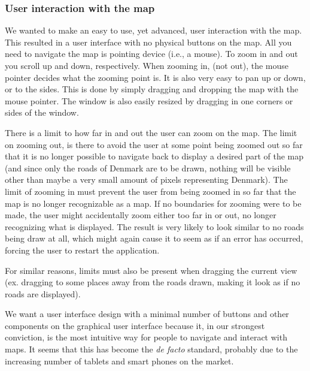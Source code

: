 \subsubsection{User interaction with the map}
We wanted to make an easy to use, yet advanced, user interaction with the map. This resulted in a user interface with no physical buttons on the map. All you need to navigate the map is pointing device (i.e., a mouse). To zoom in and out you scroll up and down, respectively. When zooming in, (not out), the mouse pointer decides what the zooming point is. It is also very easy to pan up or down, or to the sides. This is done by simply dragging and dropping the map with the mouse pointer. The window is also easily resized by dragging in one corners or sides of the window.

There is a limit to how far in and out the user can zoom on the map. The limit on zooming out, is there to avoid the user at some point being zoomed out so far that it is no longer possible to navigate back to display a desired part of the map (and since only the roads of Denmark are to be drawn, nothing will be visible other than maybe a very small amount of pixels representing Denmark). The limit of zooming in must prevent the user from being zoomed in so far that the map is no longer recognizable as a map. If no boundaries for zooming were to be made, the user might accidentally zoom either too far in or out, no longer recognizing what is displayed. The result is very likely to look similar to no roads being draw at all, which might again cause it to seem as if an error has occurred, forcing the user to restart the application.

For similar reasons, limits must also be present when dragging the current view (ex. dragging to some places away from the roads drawn, making it look as if no roads are displayed).

We want a user interface design with a minimal number of buttons and other components on the graphical user interface because it, in our strongest conviction, is the most intuitive way for people to navigate and interact with maps. It seems that this has become the \textit{de facto} standard, probably due to the increasing number of tablets and smart phones on the market.

